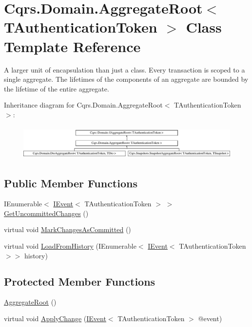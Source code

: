 \hypertarget{classCqrs_1_1Domain_1_1AggregateRoot}{}\section{Cqrs.\+Domain.\+Aggregate\+Root$<$ T\+Authentication\+Token $>$ Class Template Reference}
\label{classCqrs_1_1Domain_1_1AggregateRoot}


A larger unit of encapsulation than just a class. Every transaction is scoped to a single aggregate. The lifetimes of the components of an aggregate are bounded by the lifetime of the entire aggregate.  


Inheritance diagram for Cqrs.\+Domain.\+Aggregate\+Root$<$ T\+Authentication\+Token $>$\+:\begin{figure}[H]
\begin{center}
\leavevmode
\includegraphics[height=1.822126cm]{classCqrs_1_1Domain_1_1AggregateRoot}
\end{center}
\end{figure}
\subsection*{Public Member Functions}
\begin{DoxyCompactItemize}
\item 
I\+Enumerable$<$ \hyperlink{interfaceCqrs_1_1Events_1_1IEvent}{I\+Event}$<$ T\+Authentication\+Token $>$ $>$ \hyperlink{classCqrs_1_1Domain_1_1AggregateRoot_a625e885ec7885a686f729ed1efe3a8fa}{Get\+Uncommitted\+Changes} ()
\item 
virtual void \hyperlink{classCqrs_1_1Domain_1_1AggregateRoot_adab968b830e186cb832583910bf6f3a6}{Mark\+Changes\+As\+Committed} ()
\item 
virtual void \hyperlink{classCqrs_1_1Domain_1_1AggregateRoot_aec873ad6e4c98309cad2d9f1c534aebb}{Load\+From\+History} (I\+Enumerable$<$ \hyperlink{interfaceCqrs_1_1Events_1_1IEvent}{I\+Event}$<$ T\+Authentication\+Token $>$$>$ history)
\end{DoxyCompactItemize}
\subsection*{Protected Member Functions}
\begin{DoxyCompactItemize}
\item 
\hyperlink{classCqrs_1_1Domain_1_1AggregateRoot_a1db2322dd7442e1e0c3c07332124eb2f}{Aggregate\+Root} ()
\item 
virtual void \hyperlink{classCqrs_1_1Domain_1_1AggregateRoot_a7e299b13c7556731e52670aa6d782296}{Apply\+Change} (\hyperlink{interfaceCqrs_1_1Events_1_1IEvent}{I\+Event}$<$ T\+Authentication\+Token $>$ @event)
\end{DoxyCompactItemize}
